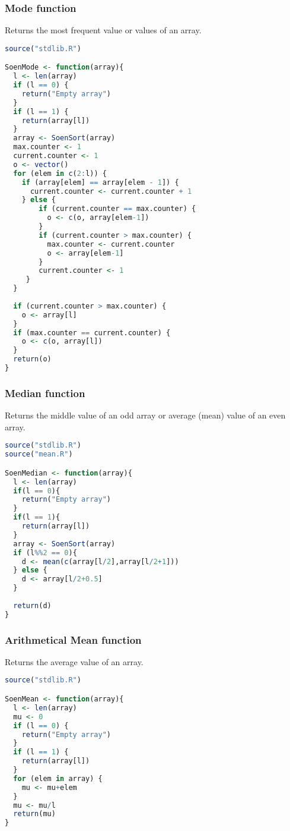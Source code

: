 \documentclass[12pt]{article}
\begin{document}
\subsubsection{Mode function}
Returns the most frequent value or values of an array.
\begin{lstlisting}[language=R]
source("stdlib.R")

SoenMode <- function(array){
  l <- len(array)
  if (l == 0) {
    return("Empty array")
  }
  if (l == 1) {
    return(array[l])
  }
  array <- SoenSort(array)
  max.counter <- 1
  current.counter <- 1
  o <- vector()
  for (elem in c(2:l)) {
    if (array[elem] == array[elem - 1]) {
      current.counter <- current.counter + 1
    } else {
        if (current.counter == max.counter) {
          o <- c(o, array[elem-1])
        }
        if (current.counter > max.counter) {
          max.counter <- current.counter
          o <- array[elem-1]
        }
        current.counter <- 1
     }
  }
  
  if (current.counter > max.counter) {
    o <- array[l]
  }
  if (max.counter == current.counter) {
    o <- c(o, array[l])
  }
  return(o)
}
\end{lstlisting}
\subsubsection{Median function}
Returns the middle value of an odd array or average (mean) value of an even array.
\begin{lstlisting}[language=R]
source("stdlib.R")
source("mean.R")

SoenMedian <- function(array){
  l <- len(array)
  if(l == 0){
    return("Empty array")
  }
  if(l == 1){
    return(array[l])
  }
  array <- SoenSort(array)
  if (l%%2 == 0){
    d <- mean(c(array[l/2],array[l/2+1]))
  } else {
    d <- array[l/2+0.5]
  }
  
  return(d)
}
\end{lstlisting}
\subsubsection{Arithmetical Mean function}
Returns the average value of an array.
\begin{lstlisting}[language=R]
source("stdlib.R")

SoenMean <- function(array){
  l <- len(array)
  mu <- 0
  if (l == 0) {
    return("Empty array")
  }
  if (l == 1) {
    return(array[l])
  }
  for (elem in array) {
    mu <- mu+elem
  }
  mu <- mu/l
  return(mu)
}
\end{lstlisting}
\end{document}
